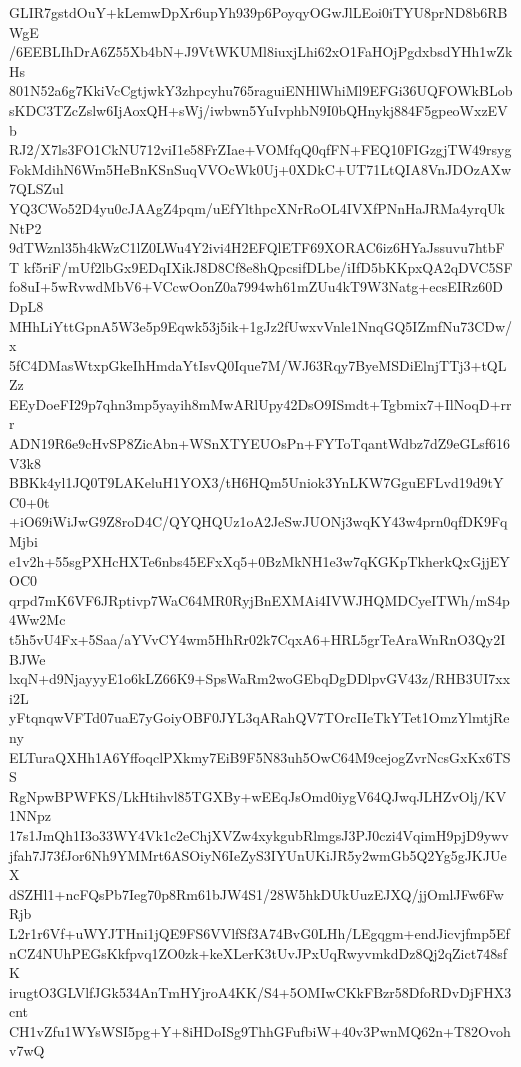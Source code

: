 GLIR7gstdOuY+kLemwDpXr6upYh939p6PoyqyOGwJlLEoi0iTYU8prND8b6RBWgE
/6EEBLIhDrA6Z55Xb4bN+J9VtWKUMl8iuxjLhi62xO1FaHOjPgdxbsdYHh1wZkHs
801N52a6g7KkiVcCgtjwkY3zhpcyhu765raguiENHlWhiMl9EFGi36UQFOWkBLob
sKDC3TZcZslw6IjAoxQH+sWj/iwbwn5YuIvphbN9I0bQHnykj884F5gpeoWxzEVb
RJ2/X7ls3FO1CkNU712viI1e58FrZIae+VOMfqQ0qfFN+FEQ10FIGzgjTW49rsyg
FokMdihN6Wm5HeBnKSnSuqVVOcWk0Uj+0XDkC+UT71LtQIA8VnJDOzAXw7QLSZul
YQ3CWo52D4yu0cJAAgZ4pqm/uEfYlthpcXNrRoOL4IVXfPNnHaJRMa4yrqUkNtP2
9dTWznl35h4kWzC1lZ0LWu4Y2ivi4H2EFQlETF69XORAC6iz6HYaJssuvu7htbFT
kf5riF/mUf2lbGx9EDqIXikJ8D8Cf8e8hQpcsifDLbe/iIfD5bKKpxQA2qDVC5SF
fo8uI+5wRvwdMbV6+VCcwOonZ0a7994wh61mZUu4kT9W3Natg+ecsEIRz60DDpL8
MHhLiYttGpnA5W3e5p9Eqwk53j5ik+1gJz2fUwxvVnle1NnqGQ5IZmfNu73CDw/x
5fC4DMasWtxpGkeIhHmdaYtIsvQ0Ique7M/WJ63Rqy7ByeMSDiElnjTTj3+tQLZz
EEyDoeFI29p7qhn3mp5yayih8mMwARlUpy42DsO9ISmdt+Tgbmix7+IlNoqD+rrr
ADN19R6e9cHvSP8ZicAbn+WSnXTYEUOsPn+FYToTqantWdbz7dZ9eGLsf616V3k8
BBKk4yl1JQ0T9LAKeluH1YOX3/tH6HQm5Uniok3YnLKW7GguEFLvd19d9tYC0+0t
+iO69iWiJwG9Z8roD4C/QYQHQUz1oA2JeSwJUONj3wqKY43w4prn0qfDK9FqMjbi
e1v2h+55sgPXHcHXTe6nbs45EFxXq5+0BzMkNH1e3w7qKGKpTkherkQxGjjEYOC0
qrpd7mK6VF6JRptivp7WaC64MR0RyjBnEXMAi4IVWJHQMDCyeITWh/mS4p4Ww2Mc
t5h5vU4Fx+5Saa/aYVvCY4wm5HhRr02k7CqxA6+HRL5grTeAraWnRnO3Qy2IBJWe
lxqN+d9NjayyyE1o6kLZ66K9+SpsWaRm2woGEbqDgDDlpvGV43z/RHB3UI7xxi2L
yFtqnqwVFTd07uaE7yGoiyOBF0JYL3qARahQV7TOrcIIeTkYTet1OmzYlmtjReny
ELTuraQXHh1A6YffoqclPXkmy7EiB9F5N83uh5OwC64M9cejogZvrNcsGxKx6TSS
RgNpwBPWFKS/LkHtihvl85TGXBy+wEEqJsOmd0iygV64QJwqJLHZvOlj/KV1NNpz
17s1JmQh1I3o33WY4Vk1c2eChjXVZw4xykgubRlmgsJ3PJ0czi4VqimH9pjD9ywv
jfah7J73fJor6Nh9YMMrt6ASOiyN6IeZyS3IYUnUKiJR5y2wmGb5Q2Yg5gJKJUeX
dSZHl1+ncFQsPb7Ieg70p8Rm61bJW4S1/28W5hkDUkUuzEJXQ/jjOmlJFw6FwRjb
L2r1r6Vf+uWYJTHni1jQE9FS6VVlfSf3A74BvG0LHh/LEgqgm+endJicvjfmp5Ef
nCZ4NUhPEGsKkfpvq1ZO0zk+keXLerK3tUvJPxUqRwyvmkdDz8Qj2qZict748sfK
irugtO3GLVlfJGk534AnTmHYjroA4KK/S4+5OMIwCKkFBzr58DfoRDvDjFHX3cnt
CH1vZfu1WYsWSI5pg+Y+8iHDoISg9ThhGFufbiW+40v3PwnMQ62n+T82Ovohv7wQ
